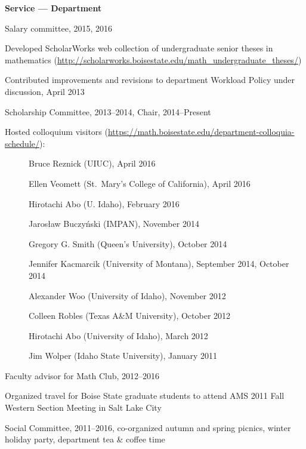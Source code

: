 \documentclass[12pt]{article}
\begin{document}
\textbf{Service --- Department}
\begin{description}
\setlength{}

\item[] Salary committee, 2015, 2016

\item[] Developed ScholarWorks web collection of undergraduate senior theses in mathematics
(\url{http://scholarworks.boisestate.edu/math_undergraduate_theses/})

\item[] Contributed improvements and revisions to department Workload Policy under discussion, April 2013

\item[] Scholarship Committee, 2013--2014, Chair, 2014--Present

\item[] Hosted colloquium visitors (\url{https://math.boisestate.edu/department-colloquia-schedule/}):
\begin{description}
\item[] Bruce Reznick (UIUC), April 2016
\item[] Ellen Veomett (St.\ Mary's College of California), April 2016
\item[] Hirotachi Abo (U. Idaho), February 2016
\item[] Jaros{\l}aw Buczy\'nski (IMPAN), November 2014
\item[] Gregory G. Smith (Queen's University), October 2014
\item[] Jennifer Kacmarcik (University of Montana), September 2014, October 2014 %
\item[] Alexander Woo (University of Idaho), November 2012
\item[] Colleen Robles (Texas A\&M University), October 2012
\item[] Hirotachi Abo (University of Idaho), March 2012
\item[] Jim Wolper (Idaho State University), January 2011
\end{description}

\item[] Faculty advisor for Math Club, 2012--2016

\item[] Organized travel for Boise State graduate students to attend AMS 2011 Fall Western Section Meeting in Salt Lake City

\item[] Social Committee, 2011--2016, co-organized autumn and spring picnics, winter holiday party, department tea \& coffee time

\end{description}
\end{document}
